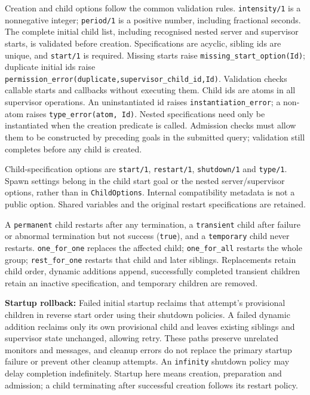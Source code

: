 Creation and child options follow the common validation rules. \texttt{intensity/\allowbreak{}1} is a nonnegative
integer; \texttt{period/\allowbreak{}1} is a positive number, including fractional seconds. The complete initial
child list, including recognised nested server and supervisor starts, is validated before creation.
Specifications are acyclic, sibling ids are unique, and \texttt{start/\allowbreak{}1} is required. Missing starts
raise \texttt{missing\_\allowbreak{}start\_\allowbreak{}option(\allowbreak{}Id)}; duplicate initial ids raise
\texttt{permission\_\allowbreak{}error(\allowbreak{}duplicate,\allowbreak{}supervisor\_\allowbreak{}child\_\allowbreak{}id,\allowbreak{}Id)}. Validation checks callable starts
and callbacks without executing them. Child ids are atoms in all supervisor
operations. An uninstantiated id raises \texttt{instantiation\_error}; a
non-atom raises \texttt{type\_\allowbreak{}error(\allowbreak{}atom,\allowbreak{} Id)}. Nested specifications need
only be instantiated when the creation predicate is called. Admission checks
must allow them to be constructed by preceding goals in the submitted query;
validation still completes before any child is created.

Child-specification options are \texttt{start/\allowbreak{}1},
\texttt{restart/\allowbreak{}1}, \texttt{shutdown/\allowbreak{}1} and
\texttt{type/\allowbreak{}1}. Spawn settings belong in the child start goal
or the nested server/supervisor options, rather than in \texttt{ChildOptions}.
Internal compatibility metadata is not a public option. Shared variables and
the original restart specifications are retained.

A \texttt{permanent} child restarts after any termination, a \texttt{transient} child after failure
or abnormal termination but not success (\texttt{true}), and a \texttt{temporary} child never
restarts. \texttt{one\_\allowbreak{}for\_\allowbreak{}one} replaces the affected child; \texttt{one\_\allowbreak{}for\_\allowbreak{}all} restarts the
whole group; \texttt{rest\_\allowbreak{}for\_\allowbreak{}one} restarts that child and later siblings. Replacements retain
child order, dynamic additions append, successfully completed transient children retain an inactive
specification, and temporary children are removed.

\textbf{Startup rollback:} Failed initial startup reclaims that attempt's provisional children in
reverse start order using their shutdown policies. A failed dynamic addition reclaims only its own
provisional child and leaves existing siblings and supervisor state unchanged, allowing retry.
These paths preserve unrelated monitors and messages, and cleanup errors do not replace the primary
startup failure or prevent other cleanup attempts. An \texttt{infinity} shutdown policy may delay
completion indefinitely. Startup here means creation, preparation and admission; a child terminating
after successful creation follows its restart policy.

